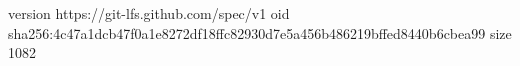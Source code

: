 version https://git-lfs.github.com/spec/v1
oid sha256:4c47a1dcb47f0a1e8272df18ffc82930d7e5a456b486219bffed8440b6cbea99
size 1082
